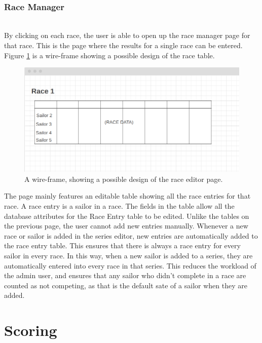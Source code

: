 \documentclass{l4proj}
\begin{document}
\hfill\\
\subsubsection{Race Manager}
\hfill\\
By clicking on each race, the user is able to open up the race manager page for that race. This is the page where the results for a single race can be entered. Figure \ref{fig:raceEditorWF} is a wire-frame showing a possible design of the race table.

\begin{figure}[h!]
    \centering
    \includegraphics[width=1\linewidth]{images/Race editor.png} 

    \caption{A wire-frame, showing a possible design of the race editor page.
    }

    \label{fig:raceEditorWF}
\end{figure}

The page mainly features an editable table showing all the race entries for that race. A race entry is a sailor in a race. The fields in the table allow all the database attributes for the Race Entry table to be edited. Unlike the tables on the previous page, the user cannot add new entries manually. Whenever a new race or sailor is added in the series editor, new entries are automatically added to the race entry table. This ensures that there is always a race entry for every sailor in every race. In this way, when a new sailor is added to a series, they are automatically entered into every race in that series. This reduces the workload of the admin user, and ensures that any sailor who didn't complete in a race are counted as not competing, as that is the default sate of a sailor when they are added.

\section{Scoring}
\end{document}

